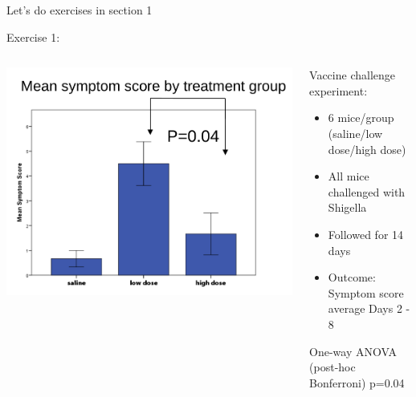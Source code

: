 \documentclass{beamer}
\begin{document}
\begin{frame}{Let's do exercises in section 1}
 
\end{frame}

\begin{frame}{Exercise 1:}

  \begin{columns}
    \begin{column}{0.5\textwidth}
	\begin{center}
	\includegraphics[width=\textwidth]{Figures/message1}
	\end{center}
    \end{column}
    
    \begin{column}{0.5\textwidth}
    \begin{block}{Vaccine challenge experiment:}
      \begin{itemize} 
       \item 6 mice/group (saline/low dose/high dose)
       \item All mice challenged with Shigella
       \item Followed for 14 days
       \item  Outcome: Symptom score average Days 2 - 8
      \end{itemize}
      \end{block}
      
      \begin{alertblock}{}
       One-way ANOVA (post-hoc Bonferroni) p=0.04
      \end{alertblock}

    \end{column}
  \end{columns}
  

\end{frame}
\end{document}
